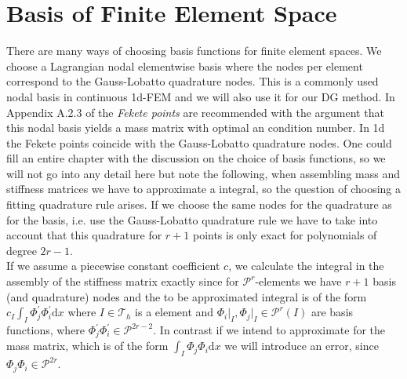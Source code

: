 \section{Basis of Finite Element Space}
\label{sec:ell_basis}
There are many ways of choosing basis functions for finite element spaces. We choose a Lagrangian
nodal elementwise basis where the nodes per element correspond to the Gauss-Lobatto quadrature nodes.
This is a commonly used nodal basis in continuous 1d-FEM and we will also use it for our DG method. In Appendix A.2.3 of \cite{diPietro2012} the \textit{Fekete points} are recommended 
with the argument that this nodal basis yields a mass matrix with optimal an condition number. In 1d the Fekete points coincide with the Gauss-Lobatto quadrature nodes. 
One could fill an entire chapter with the discussion on the choice of basis functions, so 
we will not go into any detail here but note the following, when assembling mass and stiffness matrices we have to approximate a integral, so the question of choosing a fitting quadrature 
rule arises. If we choose the same nodes for the quadrature as for the basis, i.e. use the Gauss-Lobatto quadrature rule we have to take into account that this quadrature for $r+1$ points 
is only exact for polynomials of degree $2r-1$. \\ 
If we assume a piecewise constant coefficient $c$, we calculate the integral in the assembly of the stiffness matrix exactly since
for $\mathcal{P}^r$-elements we have $r+1$ basis (and quadrature) nodes and the to be approximated integral is of the form
$ c_I \int_I \Phi_j^{\prime} \Phi_i^{\prime} \text{d}x $ where $I \in \mathcal{T}_h$ is a element and $\Phi_i \vert_I, \Phi_j \vert_I \in \mathcal{P}^r(I)$ are basis functions, where
$ \Phi_j^{\prime} \Phi_i^{\prime} \in \mathcal{P}^{2r-2}$.
In contrast if we intend to approximate for the mass matrix, which is of the form $ \int_I \Phi_j \Phi_i \text{d}x $ we will introduce an error, since $ \Phi_j \Phi_i \in \mathcal{P}^{2r}$.
 
